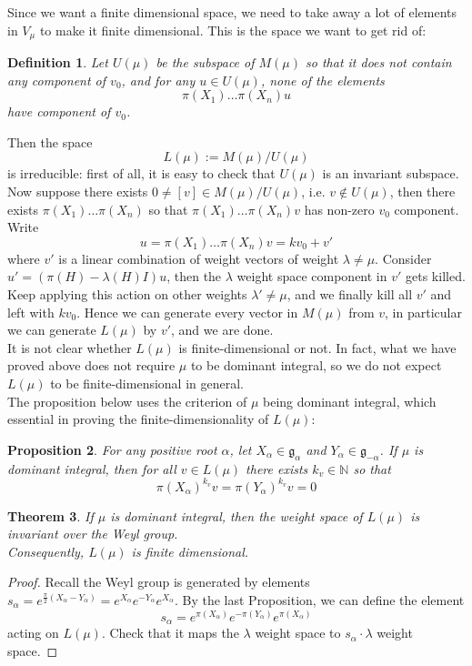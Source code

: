 \documentclass[11pt]{article}
\newtheorem{theorem}{Theorem}[section]
\newtheorem{proposition}[theorem]{Proposition}
\newtheorem{definition}[theorem]{Definition}
\newcommand{\bb}[1]{\mathbb{#1}}
\newcommand{\mf}[1]{\mathfrak{#1}}
\begin{document}
\noindent Since we want a finite dimensional space, we need to take away a lot of elements in $V_{\mu}$ to make it finite dimensional. This is the space we want to get rid of:
\begin{definition}
Let $U(\mu)$ be the subspace of $M(\mu)$ so that it does not contain any component of $v_0$, and for any $u \in U(\mu)$, none of the elements
$$\pi(X_1) \dots \pi(X_n)u$$
have component of $v_0$.
\end{definition}
Then the space
$$L(\mu) := M(\mu)/U(\mu)$$
is irreducible: first of all, it is easy to check that $U(\mu)$ is an invariant subspace. Now suppose there exists $0 \neq [v] \in M(\mu)/U(\mu)$, i.e. $v \notin U(\mu)$, then there exists $\pi(X_1)\dots\pi(X_n)$ so that $\pi(X_1)\dots\pi(X_n)v$ has non-zero $v_0$ component. Write
$$u = \pi(X_1)\dots\pi(X_n)v = kv_0 + v'$$
where $v'$ is a linear combination of weight vectors of weight $\lambda \neq \mu$. Consider $u' = (\pi(H) - \lambda(H)I)u$, then the $\lambda$ weight space component in $v'$ gets killed. Keep applying this action on other weights $\lambda' \neq \mu$, and we finally kill all $v'$ and left with $kv_0$. Hence we can generate every vector in $M(\mu)$ from $v$, in particular we can generate $L(\mu)$ by $v'$, and we are done.\\

It is not clear whether $L(\mu)$ is finite-dimensional or not. In fact, what we have proved above does not require $\mu$ to be dominant integral, so we do not expect $L(\mu)$ to be finite-dimensional in general.\\
The proposition below uses the criterion of $\mu$ being dominant integral, which essential in proving the finite-dimensionality of $L(\mu)$:
\begin{proposition}
For any positive root $\alpha$, let $X_{\alpha} \in \mf{g}_{\alpha}$ and $Y_{\alpha} \in \mf{g}_{-\alpha}$. If $\mu$ is dominant integral, then for all $v \in L(\mu)$ there exists $k_v \in \bb{N}$ so that
$$\pi(X_{\alpha})^{k_v} v = \pi(Y_{\alpha})^{k_v} v = 0$$
\end{proposition}

\begin{theorem}
If $\mu$ is dominant integral, then the weight space of $L(\mu)$ is invariant over the Weyl group.\\
Consequently, $L(\mu)$ is finite dimensional.
\end{theorem}
\begin{proof}
Recall the Weyl group is generated by elements $s_{\alpha} = e^{\frac{\pi}{2}(X_{\alpha} - Y_{\alpha})} = e^{X_{\alpha}}e^{-Y_{\alpha}}e^{X_{\alpha}}$. By the last Proposition, we can define the element
$$s_{\alpha} = e^{\pi(X_{\alpha})}e^{-\pi(Y_{\alpha})}e^{\pi(X_{\alpha})}$$
acting on $L(\mu)$. Check that it maps the $\lambda$ weight space to $s_{\alpha} \cdot \lambda$ weight space.
\end{proof}
\end{document}
